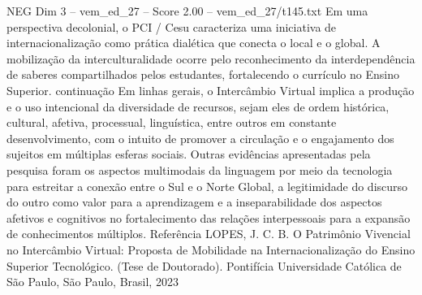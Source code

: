 \begin{textsample}{NEG Dim 3 – vem\_ed\_27 – Score 2.00 – vem\_ed\_27/t145.txt}
Em uma perspectiva decolonial, o PCI / Cesu caracteriza uma iniciativa de internacionalização como prática dialética que conecta o local e o global.
A mobilização da interculturalidade ocorre pelo reconhecimento da interdependência de saberes compartilhados pelos estudantes, fortalecendo o currículo no Ensino Superior. continuação Em linhas gerais, o Intercâmbio Virtual implica a produção e o uso intencional da diversidade de recursos, sejam eles de ordem histórica, cultural, afetiva, processual, linguística, entre outros em constante desenvolvimento, com o intuito de promover a circulação e o engajamento dos sujeitos em múltiplas esferas sociais.
Outras evidências apresentadas pela pesquisa foram os aspectos multimodais da linguagem por meio da tecnologia para estreitar a conexão entre o Sul e o Norte Global, a legitimidade do discurso do outro como valor para a aprendizagem e a inseparabilidade dos aspectos afetivos e cognitivos no fortalecimento das relações interpessoais para a expansão de conhecimentos múltiplos.
Referência LOPES, J.
C.
B.
O Patrimônio Vivencial no Intercâmbio Virtual: Proposta de Mobilidade na Internacionalização do Ensino Superior Tecnológico. (Tese de Doutorado).
Pontifícia Universidade Católica de São Paulo, São Paulo, Brasil, 2023

\end{textsample}
